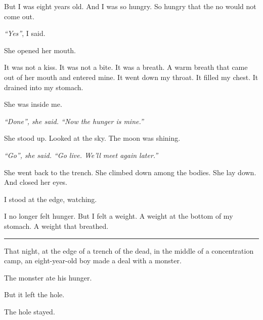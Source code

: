 \noindent But I was eight years old.
And I was so hungry.
So hungry that the no would not come out.

\noindent \textit{\textquotedblleft{}Yes\textquotedblright{}}, I said.

\noindent She opened her mouth.

\noindent It was not a kiss. It was not a bite. It was a breath. A warm breath that came out of her mouth and entered mine. It went down my throat. It filled my chest. It drained into my stomach.

\noindent She was inside me.

\noindent \textit{\textquotedblleft{}Done\textquotedblright{}\textit{, she said. }\textquotedblleft{}Now the hunger is mine.\textquotedblright{}}

\noindent She stood up. Looked at the sky. The moon was shining.

\noindent \textit{\textquotedblleft{}Go\textquotedblright{}\textit{, she said. }\textquotedblleft{}Go live. We'll meet again later.\textquotedblright{}}

\noindent She went back to the trench. She climbed down among the bodies. She lay down. And closed her eyes.

\noindent I stood at the edge, watching.

\noindent I no longer felt hunger.
But I felt a weight.
A weight at the bottom of my stomach.
A weight that breathed.

\vspace{0.5em}\noindent\rule{\textwidth}{0.5pt}\vspace{0.5em}

\noindent That night, at the edge of a trench of the dead, in the middle of a concentration camp, an eight-year-old boy made a deal with a monster.

\noindent The monster ate his hunger.

\noindent But it left the hole.

\noindent The hole stayed.

